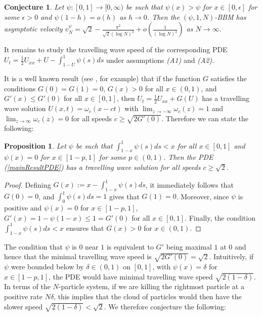 \documentclass{article}
\newtheorem{conj}[theorem]{Conjecture}
\newtheorem{propn}[theorem]{Proposition}
\begin{document}
\vspace{1em} 

\begin{conj}\label{speedConjecture} Let $\psi:[0,1]\to[0,\infty)$ be such that $\psi(x)>\psi$ for $x\in [0,\epsilon]$ for some $\epsilon>0$ and $\psi(1-h)=o(h)$ as $h\to 0$. Then the $(\psi,1,N)$-BBM has asymptotic velocity $v_N^\psi=\sqrt{2}-\frac{\pi^2}{\sqrt{2}(\log N)^2}+o\left(\frac{1}{(\log N)^2}\right)$ as $N\to\infty$. 
\end{conj}

It remains to study the travelling wave speed of the corresponding PDE $U_t = \frac12 U_{xx} + U - \int_{1-U}^1 \psi(s)ds$ under assumptions \textit{(A1)} and \textit{(A2)}.

It is a well known result (see \cite{hamelNadin}, for example) that if the function $G$ satisfies the conditions $G(0)=G(1)=0$, $G(x)>0$ for all $x\in (0,1)$, and $G'(x)\leq G'(0)$ for all $x\in [0,1]$, then $U_t = \frac12 U_{xx}+G(U)$ has a travelling wave solution $U(x,t)=\omega_c(x-ct)$ with $\lim_{z\to-\infty}\omega_c(z)=1$ and $\lim_{z\to\infty}\omega_c(z)=0$ for all speeds $c\geq \sqrt{2G'(0)}$. Therefore we can state the following:

\vspace{1em}

\begin{propn}
    Let $\psi$ be such that $\int_{1-x}^1 \psi(s)ds < x$ for all $x\in [0,1]$ and $\psi(x)=0$ for $x\in [1-p,1]$ for some $p\in (0,1)$. Then the PDE (\ref{mainResultPDE}) has a travelling wave solution for all speeds $c\geq \sqrt{2}$. 
\end{propn}

\begin{proof}
    Defining $G(x):=x-\int_{1-x}^1 \psi(s)ds$, it immediately follows that $G(0)=0$, and $\int_0^1 \psi(s)ds = 1$ gives that $G(1)=0$. Moreover, since $\psi$ is positive and $\psi(x)=0$ for $x\in [1-p,1]$, $G'(x)=1-\psi(1-x)\leq 1=G'(0)$ for all $x\in [0,1]$. Finally, the condition $\int_{1-x}^1 \psi(s)ds < x$ ensures that $G(x)>0$ for $x\in (0,1)$. 
\end{proof}

The condition that $\psi$ is $0$ near $1$ is equivalent to $G'$ being maximal $1$ at $0$ and hence that the minimal travelling wave speed is $\sqrt{2G'(0)}=\sqrt{2}$. Intuitively, if $\psi$ were bounded below by $\delta\in (0,1)$ on $[0,1]$, with $\psi(x)=\delta$ for $x\in [1-p,1]$, the PDE would have minimal travelling wave speed $\sqrt{2(1-\delta)}$. In terms of the $N$-particle system, if we are killing the rightmost particle at a positive rate $N\delta$, this implies that the cloud of particles would then have the slower speed $\sqrt{2(1-\delta)}<\sqrt{2}$. We therefore conjecture the following:
\end{document}
